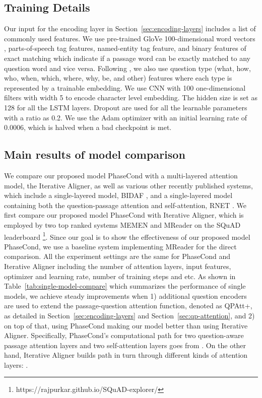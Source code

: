 \documentclass{article} \usepackage{arxiv, times}
\begin{document}
\subsection{Training Details}
Our input for the encoding layer in Section~\ref{sec:encoding-layers} includes a list of commonly used features. We use pre-trained GloVe 100-dimensional word vectors \citep{pennington2014glove}, parts-of-speech tag features, named-entity tag feature, and binary features of exact matching \citep{ChenFWB17} which indicate if a passage word can be exactly matched to any question word and vice versa. Following \cite{hureinforced}, we also use question type (what, how, who, when, which, where, why, be, and other) features \citep{ZhangZCDWJ17} where each type is represented by a trainable embedding. We use CNN with 100 one-dimensional filters with width 5 to encode character level embedding.
The hidden size is set as 128 for all the LSTM layers.
Dropout \citep{SrivastavaHKSS14} are used for all the learnable parameters with a ratio as 0.2. 
We use the Adam optimizer \citep{Adam2014} with an initial learning rate of 0.0006, which is halved when a bad checkpoint is met.

\subsection{Main results of model comparison}
We compare our proposed model PhaseCond with a multi-layered attention model, the Iterative Aligner, as well as various other recently published systems, which include a single-layered model, BIDAF \citep{seo2016bidirectional}, and a single-layered model containing both the question-passage attention and self-attention, RNET \citep{wang2017gated}. We first compare our proposed model PhaseCond with Iterative Aligner, which is employed by two top ranked systems MEMEN \citep{PanLZCCH17} and MReader \citep{hureinforced} on the SQuAD leaderboard \footnote{https://rajpurkar.github.io/SQuAD-explorer/}. Since our goal is to show the effectiveness of our proposed model PhaseCond, we use a baseline system implementing MReader for the direct comparison. All the experiment settings are the same for PhaseCond and Iterative Aligner including the number of attention layers, input features, optimizer and learning rate, number of training steps and etc. As shown in Table~\ref{tab:single-model-compare} which summarizes the performance of single models, we achieve steady improvements when 1) additional question encoders are used to extend the passage-question attention function, denoted as QPAtt+, as detailed in Section~\ref{sec:encoding-layers} and Section~\ref{sec:qp-attention}, and 2) on top of that, using PhaseCond making our
model better than using Iterative Aligner. Specifically, PhaseCond's computational path for two question-aware passage attention layers  and two self-attention layers  goes from . On the other hand, Iterative Aligner builds path in turn through different kinds of attention layers: . 
\end{document}
